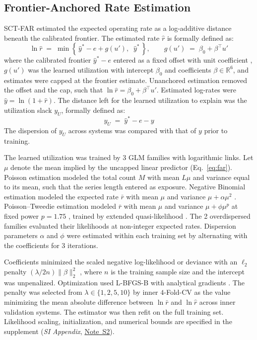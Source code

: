 \documentclass{article}
\begin{document}
\subsection*{Frontier-Anchored Rate Estimation}
\label{sec:far}
SCT-FAR estimated the expected operating rate as a log-additive distance beneath the calibrated frontier. The estimated rate $\widehat{r}$ is formally defined as:
\begin{equation}
    \ln \widehat{r} \;=\; \min\!\left\{\, \widehat{y}^* - e + g(u'),\;\; \widehat{y}^* \,\right\},
    \qquad
    g(u') \;=\; \beta_0 + \beta^{\top} u'
\label{eq:far}
\end{equation}
where the calibrated frontier $\widehat{y}^* - e$ entered as a fixed offset with unit coefficient \citep{ref138,ref177}, $g(u')$ was the learned utilization with intercept $\beta_0$ and coefficients $\beta \in \mathbb{R}^{6}$, and estimates were capped at the frontier estimate. Unanchored estimation removed the offset and the cap, such that $\ln \widehat{r} = \beta_0 + \beta^{\top} u'$. Estimated log-rates were $\widehat{y} = \ln(1 + \widehat{r})$. The distance left for the learned utilization to explain was the utilization slack $y_U$, formally defined as:
\begin{equation}
    y_U \;=\; \widehat{y}^* - e - y
\label{eq:slack}
\end{equation}
The dispersion of $y_U$ across systems was compared with that of $y$ prior to training.

The learned utilization was trained by 3 GLM families with logarithmic links. Let $\mu$ denote the mean implied by the uncapped linear predictor (Eq.~\eqref{eq:far}). Poisson estimation modeled the total count $M$ with mean $L\mu$ and variance equal to its mean, such that the series length entered as exposure. Negative Binomial estimation modeled the expected rate $\bar{r}$ with mean $\mu$ and variance $\mu + \alpha\mu^{2}$ \citep{ref140,ref182,ref178}. Poisson--Tweedie estimation modeled $\bar{r}$ with mean $\mu$ and variance $\mu + \phi\mu^{p}$ at fixed power $p = 1.75$ \citep{ref142,ref141}, trained by extended quasi-likelihood \citep{ref143,ref144}. The 2 overdispersed families evaluated their likelihoods at non-integer expected rates. Dispersion parameters $\alpha$ and $\phi$ were estimated within each training set by alternating with the coefficients for 3 iterations.

Coefficients minimized the scaled negative log-likelihood or deviance with an $\ell_2$ penalty $(\lambda/2n)\lVert\beta\rVert_2^2$ \citep{ref139}, where $n$ is the training sample size and the intercept was unpenalized. Optimization used L-BFGS-B with analytical gradients \citep{ref145}. The penalty was selected from $\lambda \in \{1, 2, 5, 10\}$ by inner $4$-Fold-CV as the value minimizing the mean absolute difference between $\ln \bar{r}$ and $\ln \widehat{r}$ across inner validation systems. The estimator was then refit on the full training set. Likelihood scaling, initialization, and numerical bounds are specified in the supplement (\textit{SI Appendix}, \hyperref[sec:si-note-estimation]{Note~S2}).
\end{document}
